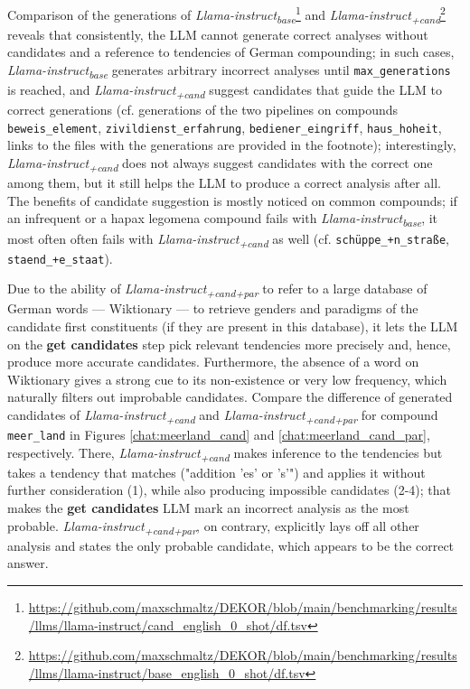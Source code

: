 \documentclass[11pt]{article}
\begin{document}
Comparison of the generations of \textit{Llama-instruct\textsubscript{base}}\footnote{\url{https://github.com/maxschmaltz/DEKOR/blob/main/benchmarking/results/llms/llama-instruct/cand_english_0_shot/df.tsv}} and \textit{Llama-instruct\textsubscript{+cand}}\footnote{\url{https://github.com/maxschmaltz/DEKOR/blob/main/benchmarking/results/llms/llama-instruct/base_english_0_shot/df.tsv}} reveals that consistently, the LLM cannot generate correct analyses without candidates and a reference to tendencies of German compounding; in such cases, \textit{Llama-instruct\textsubscript{base}} generates arbitrary incorrect analyses until \texttt{max\_generations} is reached, and \textit{Llama-instruct\textsubscript{+cand}} suggest candidates that guide the LLM to correct generations (cf. generations of the two pipelines on compounds \texttt{beweis\_element}, \texttt{zivildienst\_erfahrung}, \texttt{bediener\_eingriff}, \texttt{haus\_hoheit}, links to the files with the generations are provided in the footnote); interestingly, \textit{Llama-instruct\textsubscript{+cand}} does not always suggest candidates with the correct one among them, but it still helps the LLM to produce a correct analysis after all. The benefits of candidate suggestion is mostly noticed on common compounds; if an infrequent or a hapax legomena compound fails with \textit{Llama-instruct\textsubscript{base}}, it most often often fails with \textit{Llama-instruct\textsubscript{+cand}} as well (cf. \texttt{sch{\"u}ppe\_+n\_stra{\ss}e}, \texttt{staend\_+e\_staat}).

Due to the ability of \textit{Llama-instruct\textsubscript{+cand+par}} to refer to a large database of German words --- Wiktionary --- to retrieve genders and paradigms of the candidate first constituents (if they are present in this database), it lets the LLM on the \textbf{get candidates} step pick relevant tendencies more precisely and, hence, produce more accurate candidates. Furthermore, the absence of a word on Wiktionary gives a strong cue to its non-existence or very low frequency, which naturally filters out improbable candidates. Compare the difference of generated candidates of \textit{Llama-instruct\textsubscript{+cand}} and \textit{Llama-instruct\textsubscript{+cand+par}} for compound \texttt{meer\_land} in Figures \ref{chat:meerland_cand} and \ref{chat:meerland_cand_par}, respectively. There, \textit{Llama-instruct\textsubscript{+cand}} makes inference to the tendencies but takes a tendency that matches ("addition 'es' or 's'") and applies it without further consideration (1), while also producing impossible candidates (2-4); that makes the \textbf{get candidates} LLM mark an incorrect analysis as the most probable. \textit{Llama-instruct\textsubscript{+cand+par}}, on contrary, explicitly lays off all other analysis and states the only probable candidate, which appears to be the correct answer.
\end{document}

